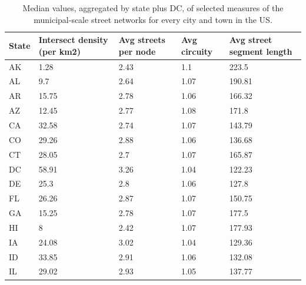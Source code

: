 \documentclass{article}
\begin{document}
\begin{table}
\centering
\caption{Median values, aggregated by state plus DC, of selected measures of the municipal-scale street networks for every city and town in the US.}
\label{table04}
\begin{tabular}{p{1in}p{1in}p{1in}p{1in}p{1in}}
	\toprule
	State & Intersect density (per km2) & Avg streets per node & Avg circuity & Avg street segment length \\
	\midrule
	AK    & 1.28                        & 2.43                 & 1.1          & 223.5                     \\
	AL    & 9.7                         & 2.64                 & 1.07         & 190.81                    \\
	AR    & 15.75                       & 2.78                 & 1.06         & 166.32                    \\
	AZ    & 12.45                       & 2.77                 & 1.08         & 171.8                     \\
	CA    & 32.58                       & 2.74                 & 1.07         & 143.79                    \\
	CO    & 29.26                       & 2.88                 & 1.06         & 136.68                    \\
	CT    & 28.05                       & 2.7                  & 1.07         & 165.87                    \\
	DC    & 58.91                       & 3.26                 & 1.04         & 122.23                    \\
	DE    & 25.3                        & 2.8                  & 1.06         & 127.8                     \\
	FL    & 26.26                       & 2.87                 & 1.07         & 150.75                    \\
	GA    & 15.25                       & 2.78                 & 1.07         & 177.5                     \\
	HI    & 8                           & 2.42                 & 1.07         & 177.93                    \\
	IA    & 24.08                       & 3.02                 & 1.04         & 129.36                    \\
	ID    & 33.85                       & 2.91                 & 1.06         & 132.08                    \\
	IL    & 29.02                       & 2.93                 & 1.05         & 137.77                    \\

\end{tabular}
\end{table}
\end{document}
